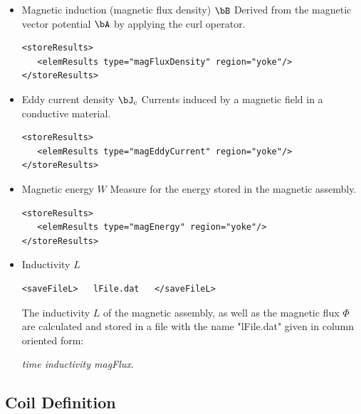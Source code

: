 \begin{itemize}
\item Magnetic induction (magnetic flux density) $\bB$
    \newline Derived from the magnetic vector potential $\bA$ by
    applying the curl operator.
  
\begin{verbatim}
<storeResults>
   <elemResults type="magFluxDensity" region="yoke"/>
</storeResults>
\end{verbatim}
  
\item Eddy current density $\bJ_{\rm e}$ 
    \newline Currents induced by a magnetic field in a conductive
    material. 

\begin{verbatim}
<storeResults>
   <elemResults type="magEddyCurrent" region="yoke"/>
</storeResults>
\end{verbatim}
  
  
\item Magnetic energy $W$ 
    \newline Measure for the energy stored in the magnetic assembly.
  
\begin{verbatim}
<storeResults>
   <elemResults type="magEnergy" region="yoke"/>
</storeResults>
\end{verbatim}

\item  Inductivity $L$ 

\begin{verbatim}
<saveFileL>   lFile.dat   </saveFileL>
\end{verbatim}

The inductivity $L$ of the magnetic assembly, as well as
the magnetic flux $\Phi$ are calculated and stored in a file with
the name "lFile.dat"  given in column oriented form:

{\em time inductivity magFlux}.  
  


\end{itemize}

\subsection{Coil Definition}

